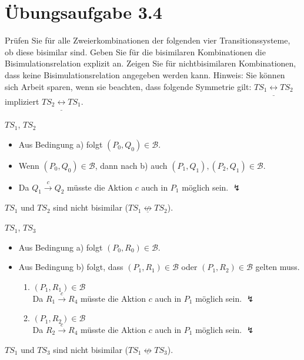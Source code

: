\documentclass[a4paper]{scrartcl}
\begin{document}
\section*{Übungsaufgabe 3.4}
Prüfen Sie für alle Zweierkombinationen der folgenden vier Transitionssysteme, ob 
diese bisimilar sind. Geben Sie für die bisimilaren Kombinationen die 
Bisimulationsrelation explizit an. Zeigen Sie für nichtbisimilaren Kombinationen, 
dass keine Bisimulationsrelation angegeben werden kann. Hinweis: Sie können sich 
Arbeit sparen, wenn sie beachten, dass folgende Symmetrie gilt: 
$TS_1 \underline{\leftrightarrow} TS_2$ impliziert $TS_2 \underline{\leftrightarrow} TS_1$.
\begin{description}
    \item $TS_1$, $TS_2$
        \begin{itemize}
            \item Aus Bedingung a) folgt $(P_0, Q_0) \in \mathcal{B}$.
            \item Wenn $(P_0, Q_0) \in \mathcal{B}$, dann nach b) auch
                $(P_1, Q_1), (P_2, Q_1) \in \mathcal{B}$.
            \item Da $Q_1 \stackrel{c}{\rightarrow} Q_2$ müsste die Aktion $c$
                auch in $P_1$ möglich sein. $\lightning$
        \end{itemize}
        $TS_1$ und $TS_2$ sind nicht bisimilar
        ($TS_1  \underline{\not\leftrightarrow} TS_2$).

    \item $TS_1$, $TS_3$
        \begin{itemize}
            \item Aus Bedingung a) folgt $(P_0, R_0) \in \mathcal{B}$.
            \item Aus Bedingung b) folgt, dass $(P_1, R_1) \in \mathcal{B}$
                oder $(P_1, R_2) \in \mathcal{B}$ gelten muss.
                \begin{enumerate}
                    \item $(P_1, R_1) \in \mathcal{B}$ \\
                        Da $R_1 \stackrel{c}{\rightarrow} R_4$ müsste die Aktion
                        $c$ auch in $P_1$ möglich sein. $\lightning$
                    \item $(P_1, R_2) \in \mathcal{B}$ \\
                        Da $R_2 \stackrel{c}{\rightarrow} R_4$ müsste die Aktion
                        $c$ auch in $P_1$ möglich sein. $\lightning$
                \end{enumerate}
        \end{itemize}
        $TS_1$ und $TS_3$ sind nicht bisimilar
        ($TS_1  \underline{\not\leftrightarrow} TS_3$).


\end{description}
\end{document}
